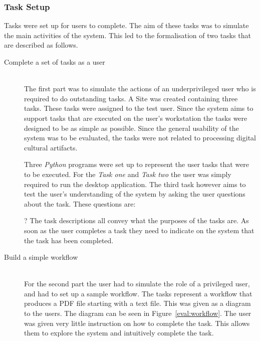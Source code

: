 \documentclass[12pt,a4paper]{report}
\begin{document}
\subsubsection{Task Setup}
Tasks were set up for users to complete. The aim of these tasks was to simulate
the main activities of the system. This led to the formalisation of two tasks
that are described as follows.
\begin{description}
\item[Complete a set of tasks as a user] \hfill \\
    The first part was to simulate the actions of an underprivileged user
    who is required to do outstanding tasks.  A Site was created containing three
    tasks. These tasks were assigned to the test user. Since the system aims to
    support tasks that are executed on the user's workstation the tasks were
    designed to be as simple as possible. Since the general usability of the system
    was to be evaluated, the tasks were not related to processing digital cultural
    artifacts.

    Three \emph{Python} programs were set up to represent the user tasks
    that were to be executed. For the \emph{Task one} and \emph{Task two}
    the user was simply required to run the desktop application. The third
    task however aims to test the user's understanding of the system by
    asking the user questions about the task. These questions are:
    ?   The task descriptions all convey what the purposes
    of the tasks are. As soon as the user completes a task they need to
    indicate on the system that the task has been completed.
\item[Build a simple workflow] \hfill \\
    For the second part the user had to simulate the role of a privileged
    user, and had to set up a sample workflow. The tasks represent a workflow
    that produces a PDF file starting with a text file. This was given as a
    diagram to the users. The diagram can be seen in Figure~\ref{eval:workflow}.
        The user was given very little instruction on how to complete the task.
    This allows them to explore the system and intuitively complete the task.

\end{description}
\end{document}
